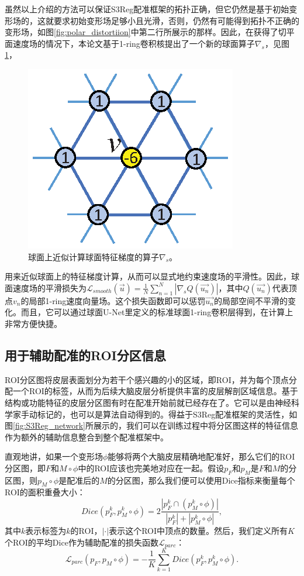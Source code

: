 虽然以上介绍的方法可以保证S3Reg配准框架的拓扑正确，但它仍然是基于初始变形场的，这就要求初始变形场足够小且光滑\cite{yeo2009spherical}，否则，仍然有可能得到拓扑不正确的变形场，如图\ref{fig:polar_distortiion}中第二行所展示的那样。因此，在获得了切平面速度场的情况下，本论文基于1-ring卷积核提出了一个新的球面算子$\nabla_s$，见图\ref{fig:gradient_kernel}，
\begin{figure}[h]
	\centering
	\includegraphics[width=0.35\columnwidth]{figure/gradient_kernel.eps}
	\caption{球面上近似计算球面特征梯度的算子$\nabla_s$。}
	\label{fig:gradient_kernel}
\end{figure}
用来近似球面上的特征梯度计算，从而可以显式地约束速度场的平滑性。因此，球面速度场的平滑损失为${\mathcal{L}}_{smooth}(\overrightarrow{u})=\frac{1}{N} \sum_{n=1}^{N} |\nabla_s Q(\overrightarrow{u_n}) | $，其中$Q(\overrightarrow{u_n})$代表顶点$v_n$的局部1-ring速度向量场。这个损失函数即可以惩罚$\overrightarrow{u_n}$的局部空间不平滑的变化。而且，它可以通过球面U-Net里定义的标准球面1-ring卷积层得到，在计算上非常方便快捷。

\subsection{用于辅助配准的ROI分区信息}
ROI分区图将皮层表面划分为若干个感兴趣的小的区域，即ROI，并为每个顶点分配一个ROI的标签，从而为后续大脑皮层分析提供丰富的皮层解剖区域信息。基于结构或功能特征的皮层分区图有时在配准开始前就已经存在了。它可以是由神经科学家手动标记的，也可以是算法自动得到的\cite{zhao2019spherical_isbi}。得益于S3Reg配准框架的灵活性，如图\ref{fig:S3Reg_network}所展示的，我们可以在训练过程中将分区图这样的特征信息作为额外的辅助信息整合到整个配准框架中。

直观地讲，如果一个变形场$\phi$能够将两个大脑皮层精确地配准好，那么它们的ROI分区图，即$F$和$M\circ \phi$中的ROI应该也完美地对应在一起。假设$p_F$和$p_M$是$F$和$M$的分区图，则$p_M\circ \phi$是配准后的$M$的分区图，那么我们便可以使用Dice指标来衡量每个ROI的面积重叠大小：
\begin{equation}\label{eq:Dice}
Dice(p_F^k, p_M^k \circ \phi) = 2 \frac{| p_F^k \cap (p_M^k \circ \phi)|}{|p_F^k| + |p_M^k \circ \phi|},
\end{equation}
其中$k$表示标签为$k$的ROI，$|\cdot|$表示这个ROI中顶点的数量。然后，我们定义所有$K$个ROI的平均Dice作为辅助配准的损失函数${\mathcal{L}}_{parc}$：
\begin{equation}
{\mathcal{L}}_{parc}(p_F,p_M \circ \phi) = -\frac{1}{K} \sum_{k=1}^{K} Dice(p_F^k, p_M^k \circ \phi).
\end{equation}

